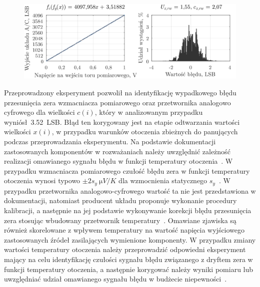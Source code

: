 \begin{figure}[htb!]
\begin{center}
\includegraphics{obrazki/static_adcout}
\end{center}
\end{figure}

Przeprowadzony eksperyment pozwolił na identyfikację wypadkowego błędu przesunięcia zera wzmacniacza pomiarowego oraz przetwornika analogowo cyfrowego dla wielkości $c(i)$, który w analizowanym przypadku wyniósł~\qty{3.52}{LSB}. Błąd ten korygowany jest na etapie odtwarzania wartości wielkości $x(i)$, w przypadku warunków otoczenia zbieżnych do panujących podczas przeprowadzania eksperymentu. Na podstawie dokumentacji zastosowanych komponentów w rozważaniach należy uwzględnić zależność realizacji omawianego sygnału błędu w funkcji temperatury otoczenia~\cite{microchip_manual, stm_f411, diodes_manual, stm_manual}. W przypadku wzmacniacza pomiarowego czułość błędu zera w funkcji temperatury otoczenia wynosi typowo $\pm 2 s_{y}~\unit{\micro V \per K}$ dla wzmocnienia statycznego $s_{y}$~\cite{microchip_manual}. W przypadku przetwornika analogowo-cyfrowego wartość ta nie jest przedstawiona w dokumentacji, natomiast producent układu proponuje wykonanie procedury kalibracji, a następnie na jej podstawie wykonywanie korekcji błędu przesunięcia zera stosując wbudowany przetwornik temperatury~\cite{stm_adc}. Omawiane zjawiska są również skorelowane z wpływem temperatury na wartość napięcia wyjściowego zastosowanych źródeł zasilających wymienione komponenty. W przypadku zmiany wartości temperatury otoczenia należy przeprowadzić odpowiedni eksperyment mający na celu identyfikację czułości sygnału błędu związanego z dryftem zera w funkcji temperatury otoczenia, a następnie korygować należy wyniki pomiaru lub uwzględniać udział omawianego sygnału błędu w budżecie niepewności~\cite{jcgm_guide}.

